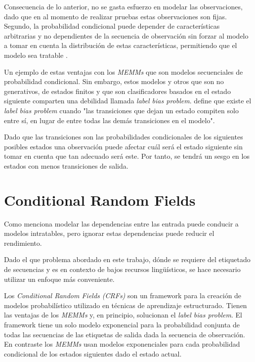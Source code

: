 \documentclass[letterpaper,12pt,oneside]{book}
\begin{document}
Consecuencia de lo anterior, no se gasta esfuerzo en modelar las observaciones, dado que en al momento de realizar pruebas estas observaciones son fijas. Segundo, la probabilidad condicional puede depender de características arbitrarias y no dependientes de la secuencia de observación sin forzar al modelo a tomar en cuenta la distribución de estas características, permitiendo que el modelo sea tratable \citep{lafferty2001conditional}.

Un ejemplo de estas ventajas con los \textit{MEMMs} que son modelos secuenciales de probabilidad condicional. Sin embargo, estos modelos y otros que son no generativos, de estados finitos y que son clasificadores basados en el estado siguiente comparten una debilidad llamada \emph{label bias problem}. \citet{lafferty2001conditional} define que existe el \emph{label bias problem} cuando "las transiciones que dejan un estado compiten solo entre sí, en lugar de entre todas las demás transiciones en el modelo".

Dado que las transiciones son las probabilidades condicionales de los siguientes posibles estados una observación puede afectar cuál será el estado siguiente sin tomar en cuenta que tan adecuado será este. Por tanto, se tendrá un sesgo en los estados con menos transiciones de salida.  

\section{Conditional Random Fields}

Como menciona \citet{sutton2012introduction} modelar las dependencias entre las entrada puede conducir a modelos intratables, pero ignorar estas dependencias puede reducir el rendimiento.

Dado el que problema abordado en este trabajo, dónde se requiere del etiquetado de secuencias y es en contexto de bajos recursos lingüísticos, se hace necesario utilizar un enfoque más conveniente.

Los \textit{Conditional Random Fields (CRFs)} son un framework para la creación de modelos probabilístico utilizado en técnicas de aprendizaje estructurado. Tienen las ventajas de los \textit{MEMMs} y, en principio, solucionan el \emph{label bias problem}. El framework tiene un solo modelo exponencial para la probabilidad conjunta de todas las secuencias de las etiquetas de salida dada la secuencia de observación. En contraste los \emph{MEMMs} usan modelos exponenciales para cada probabilidad condicional de los estados siguientes dado el estado actual.
\end{document}
